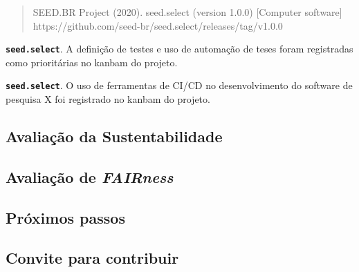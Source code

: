 \begin{quote}
    SEED.BR Project (2020). seed.select (version 1.0.0) [Computer software] https://github.com/seed-br/seed.select/releases/tag/v1.0.0
\end{quote}

\noindent \textbf{\texttt{seed.select}}.
A definição de testes e uso de automação de teses foram registradas como prioritárias no kanbam do projeto.

\noindent \textbf{\texttt{seed.select}}.
O uso de ferramentas de CI/CD no desenvolvimento do
software de pesquisa X foi registrado no kanbam do projeto.

\subsection*{Avaliação da Sustentabilidade}

%

\subsection*{Avaliação de \textit{FAIRness}}

%


\subsection{Próximos passos}

\subsection{Convite para contribuir}



